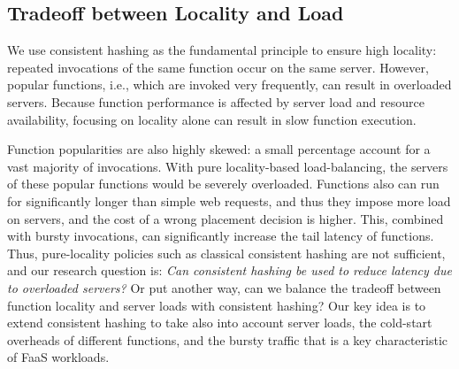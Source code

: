 

\subsection{Tradeoff between Locality and Load}
\label{subsec:locality-load-xoff}
We use consistent hashing as the fundamental principle to ensure high locality: repeated invocations of the same function occur on the same server. 
However, popular functions, i.e., which are invoked very frequently, can result in overloaded servers.
Because function performance is affected by server load and resource availability, focusing on locality alone can result in slow function execution.

Function popularities are also highly skewed: a small percentage account for a vast majority of invocations.
With pure locality-based load-balancing, the servers of these popular functions would be severely overloaded.
Functions also can run for significantly longer than simple web requests, and thus they impose more load on servers, and the cost of a wrong placement decision is higher. 
This, combined with bursty invocations, can significantly increase the tail latency of functions. 
Thus, pure-locality policies such as classical consistent hashing are not sufficient, and 
our research question is: \emph{Can consistent hashing be used to reduce latency due to overloaded servers?} 
Or put another way, can we balance the tradeoff between function locality and server loads with consistent hashing? 
%
Our key idea is to extend consistent hashing to take also into account server loads, the cold-start overheads of different functions, and the bursty traffic that is a key characteristic of FaaS workloads.

